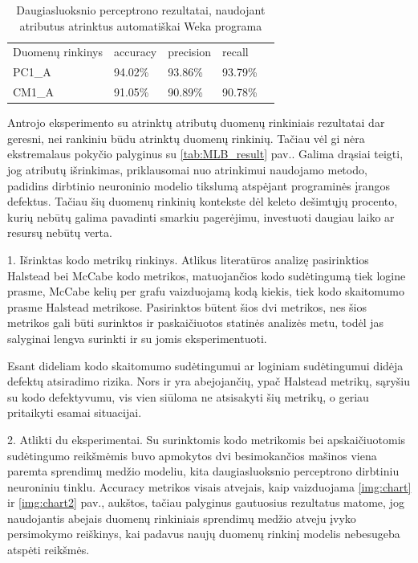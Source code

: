\documentclass{VUMIFPSbakalaurinis}
\begin{document}
\begin{table}[H]\footnotesize
\centering
\caption{Daugiasluoksnio perceptrono rezultatai, naudojant atributus atrinktus automatiškai Weka programa}
\label{tab:MLP_result_2}
\begin{tabular}{lllll}
\cline{1-4}
\multicolumn{1}{|l}{Duomenų rinkinys} & accuracy & precision & \multicolumn{1}{l|}{recall} &  \\ \cline{1-4}
\multicolumn{1}{|l}{PC1\_A}              & 94.02\%   & 93.86\%     & \multicolumn{1}{l|}{93.79\%} &  \\
\multicolumn{1}{|l}{CM1\_A}              & 91.05\%    & 90.89\%     & \multicolumn{1}{l|}{90.78\%}  &  \\ \cline{1-4}
\end{tabular}
\end{table}

Antrojo eksperimento su atrinktų atributų duomenų rinkiniais rezultatai dar geresni, nei rankiniu būdu atrinktų duomenų rinkinių. Tačiau vėl gi nėra ekstremalaus pokyčio palyginus su \ref{tab:MLB_result} pav.. Galima drąsiai teigti, jog atributų išrinkimas, priklausomai nuo atrinkimui naudojamo metodo, padidins dirbtinio neuroninio modelio tikslumą atspėjant programinės įrangos defektus. Tačiau šių duomenų rinkinių kontekste dėl keleto dešimtųjų procento, kurių nebūtų galima pavadinti smarkiu pagerėjimu, investuoti daugiau laiko ar resursų nebūtų verta.



1. Išrinktas kodo metrikų rinkinys. Atlikus literatūros analizę pasirinktios Halstead bei McCabe kodo metrikos, matuojančios kodo sudėtingumą tiek logine prasme, McCabe kelių per grafu vaizduojamą kodą kiekis, tiek kodo skaitomumo prasme Halstead metrikose. Pasirinktos būtent šios dvi metrikos, nes šios metrikos gali būti surinktos ir paskaičiuotos statinės analizės metu, todėl jas salyginai lengva surinkti ir su jomis eksperimentuoti.

Esant dideliam kodo skaitomumo sudėtingumui ar loginiam sudėtingumui didėja defektų atsiradimo rizika. Nors ir yra abejojančių, ypač Halstead metrikų, sąryšiu su kodo defektyvumu, vis vien siūloma ne atsisakyti šių metrikų, o geriau pritaikyti esamai situacijai. 

2. Atlikti du eksperimentai. Su surinktomis kodo metrikomis bei apskaičiuotomis sudėtingumo reikšmėmis buvo apmokytos dvi besimokančios mašinos viena paremta sprendimų medžio modeliu, kita daugiasluoksnio perceptrono dirbtiniu neuroniniu tinklu. Accuracy metrikos visais atvejais, kaip vaizduojama \ref{img:chart} ir \ref{img:chart2} pav., aukštos, tačiau palyginus gautuosius rezultatus matome, jog naudojantis abejais duomenų rinkiniais sprendimų medžio atveju įvyko persimokymo reiškinys, kai padavus naujų duomenų rinkinį modelis nebesugeba atspėti reikšmės.
\end{document}
